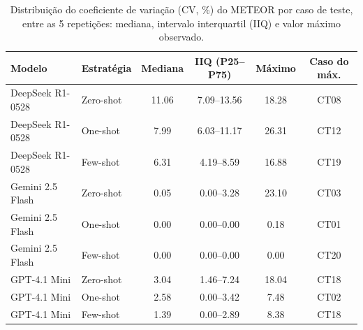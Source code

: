 \begin{table}[ht]
\centering
\caption{Distribuição do coeficiente de variação (CV, \%) do METEOR por caso de teste, entre as 5 repetições: mediana, intervalo interquartil (IIQ) e valor máximo observado.}
\label{tab:estabilidade_caso}
\footnotesize
\begin{tabular}{llcccc}
\hline
\textbf{Modelo} & \textbf{Estratégia} & \textbf{Mediana} & \textbf{IIQ (P25--P75)} & \textbf{Máximo} & \textbf{Caso do máx.} \\
\hline
DeepSeek R1-0528 & Zero-shot & 11.06 & 7.09--13.56 & 18.28 & CT08 \\
DeepSeek R1-0528 & One-shot & 7.99 & 6.03--11.17 & 26.31 & CT12 \\
DeepSeek R1-0528 & Few-shot & 6.31 & 4.19--8.59 & 16.88 & CT19 \\
Gemini 2.5 Flash & Zero-shot & 0.05 & 0.00--3.28 & 23.10 & CT03 \\
Gemini 2.5 Flash & One-shot & 0.00 & 0.00--0.00 & 0.18 & CT01 \\
Gemini 2.5 Flash & Few-shot & 0.00 & 0.00--0.00 & 0.00 & CT20 \\
GPT-4.1 Mini & Zero-shot & 3.04 & 1.46--7.24 & 18.04 & CT18 \\
GPT-4.1 Mini & One-shot & 2.58 & 0.00--3.42 & 7.48 & CT02 \\
GPT-4.1 Mini & Few-shot & 1.39 & 0.00--2.89 & 8.38 & CT18 \\
\hline
\end{tabular}
\end{table}
